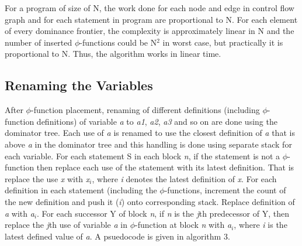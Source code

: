 \documentclass[10pt, oneside, a4paper]{article}
\begin{document}
For a program of size of N, the work done for each node and edge in control flow graph and for each statement in program are proportional to N.  For each element of every dominance frontier, the complexity is approximately linear in N and the number of inserted $\phi$-functions could be N$^2$ in worst case, but practically it is proportional to N.  Thus, the algorithm works in linear time.


\subsection{Renaming the Variables}
After $\phi$-function placement, renaming of different definitions (including $\phi$-function definitions) of variable \emph{a} to \emph{a1}, \emph{a2}, \emph{a3} and so on are done using the dominator tree.  Each use of \emph{a} is renamed to use the closest definition of \emph{a} that is above \emph{a} in the dominator tree and this handling is done using separate stack for each variable.  For each statement S in each block \emph{n}, if the statement is not a $\phi$-function then replace each use of the statement with its latest definition.  That is replace the use \emph{x} with \emph{x$_i$}, where \emph{i} denotes the latest definition of \emph{x}.  For each definition in each statement (including the $\phi$-functions, increment the count of the new definition and push it (\emph{i}) onto corresponding stack.  Replace definition of \emph{a} with \emph{a$_i$}.  For each successor Y of block \emph{n}, if \emph{n} is the \emph{j}th predecessor of Y, then replace the \emph{j}th use of variable \emph{a} in $\phi$-function at block \emph{n} with \emph{a$_i$}, where \emph{i} is the latest defined value of \emph{a}.  A psuedocode is given in algorithm 3.
\end{document}
